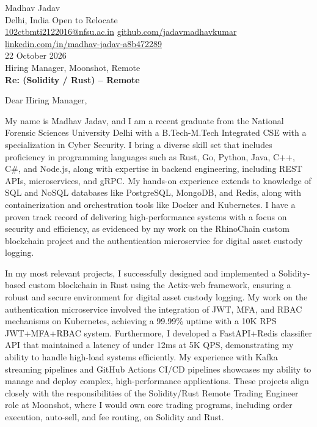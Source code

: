 \documentclass[10pt,letterpaper]{article}
\begin{document}
\begin{flushleft}
Madhav Jadav\\
Delhi, India \textbar{} Open to Relocate\\
\href{mailto:102ctbmti2122016@nfsu.ac.in}{102ctbmti2122016@nfsu.ac.in} \textbar{} \href{https://github.com/jadavmadhavkumar}{github.com/jadavmadhavkumar} \textbar{} \href{https://www.linkedin.com/in/madhav-jadav-a8b472289}{linkedin.com/in/madhav-jadav-a8b472289}\\[8pt]
22 October 2026\\[4pt]
Hiring Manager, Moonshot, Remote\\[8pt]
\textbf{Re: (Solidity / Rust) – Remote}\\[8pt]
\end{flushleft}
Dear Hiring Manager,

My name is Madhav Jadav, and I am a recent graduate from the National Forensic Sciences University Delhi with a B.Tech-M.Tech Integrated CSE with a specialization in Cyber Security. I bring a diverse skill set that includes proficiency in programming languages such as Rust, Go, Python, Java, C++, C\#, and Node.js, along with expertise in backend engineering, including REST APIs, microservices, and gRPC. My hands-on experience extends to knowledge of SQL and NoSQL databases like PostgreSQL, MongoDB, and Redis, along with containerization and orchestration tools like Docker and Kubernetes. I have a proven track record of delivering high-performance systems with a focus on security and efficiency, as evidenced by my work on the RhinoChain custom blockchain project and the authentication microservice for digital asset custody logging.

In my most relevant projects, I successfully designed and implemented a Solidity-based custom blockchain in Rust using the Actix-web framework, ensuring a robust and secure environment for digital asset custody logging. My work on the authentication microservice involved the integration of JWT, MFA, and RBAC mechanisms on Kubernetes, achieving a 99.99\% uptime with a 10K RPS JWT+MFA+RBAC system. Furthermore, I developed a FastAPI+Redis classifier API that maintained a latency of under 12ms at 5K QPS, demonstrating my ability to handle high-load systems efficiently. My experience with Kafka streaming pipelines and GitHub Actions CI/CD pipelines showcases my ability to manage and deploy complex, high-performance applications. These projects align closely with the responsibilities of the Solidity/Rust Remote Trading Engineer role at Moonshot, where I would own core trading programs, including order execution, auto-sell, and fee routing, on Solidity and Rust.
\end{document}
